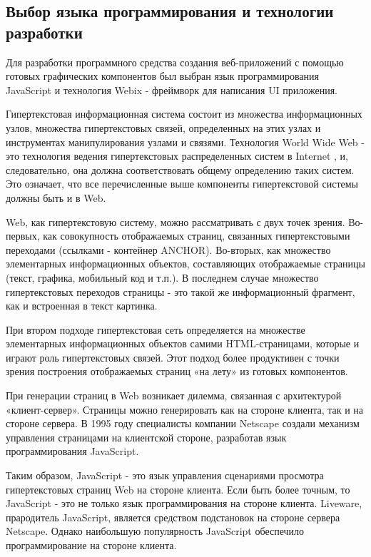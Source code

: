 \subsection{Выбор языка программирования и технологии разработки}
\label{sec:analysis:literature}

Для разработки программного средства создания веб-приложений с помощью 
готовых графических компонентов был выбран язык программирования JavaScript и технология Webix - фреймворк для написания UI приложения.

Гипертекстовая информационная система состоит из множества информационных узлов, множества гипертекстовых связей, определенных на этих узлах и инструментах манипулирования узлами и связями. Технология World Wide Web - это технология ведения гипертекстовых распределенных систем в Internet , и, следовательно, она должна соответствовать общему определению таких систем. Это означает, что все перечисленные выше компоненты гипертекстовой системы должны быть и в Web.

Web, как гипертекстовую систему, можно рассматривать с двух точек зрения. Во-первых, как совокупность отображаемых страниц, связанных гипертекстовыми переходами (ссылками - контейнер ANCHOR). Во-вторых, как множество элементарных информационных объектов, составляющих отображаемые страницы (текст, графика, мобильный код и т.п.). В последнем случае множество гипертекстовых переходов страницы - это такой же информационный фрагмент, как и встроенная в текст картинка.

При втором подходе гипертекстовая сеть определяется на множестве элементарных информационных объектов самими HTML-страницами, которые и играют роль гипертекстовых связей. Этот подход более продуктивен с точки зрения построения отображаемых страниц «на лету» из готовых компонентов.

При генерации страниц в Web возникает дилемма, связанная с архитектурой «клиент-сервер». Страницы можно генерировать как на стороне клиента, так и на стороне сервера. В 1995 году специалисты компании Netscape создали механизм управления страницами на клиентской стороне, разработав язык программирования JavaScript.

Таким образом, JavaScript - это язык управления сценариями просмотра гипертекстовых страниц Web на стороне клиента. Если быть более точным, то JavaScript - это не только язык программирования на стороне клиента. Liveware, прародитель JavaScript, является средством подстановок на стороне сервера Netscape. Однако наибольшую популярность JavaScript обеспечило программирование на стороне клиента.

